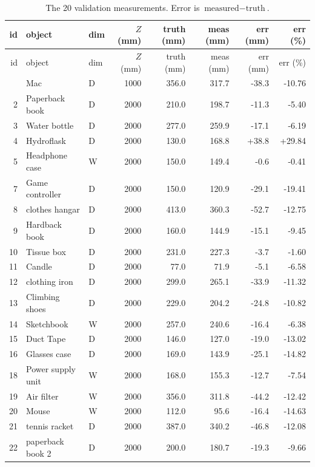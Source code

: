 \documentclass[11pt,a4paper]{article}
\begin{document}
\begin{longtable}{rllrrrrr}
\caption{The 20 validation measurements. Error is
$\text{measured} - \text{truth}$.}
\label{tab:meas} \\
\toprule
id & object & dim & $Z$ (mm) & truth (mm) & meas (mm) & err (mm) & err (\%) \\
\midrule
\endfirsthead
\toprule
id & object & dim & $Z$ (mm) & truth (mm) & meas (mm) & err (mm) & err (\%) \\
\midrule
\endhead
\bottomrule
\endfoot
1 & Mac & D & 1000 & 356.0 & 317.7 & -38.3 & -10.76 \\
2 & Paperback book & D & 2000 & 210.0 & 198.7 & -11.3 & -5.40 \\
3 & Water bottle & D & 2000 & 277.0 & 259.9 & -17.1 & -6.19 \\
4 & Hydroflask & D & 2000 & 130.0 & 168.8 & +38.8 & +29.84 \\
5 & Headphone case & W & 2000 & 150.0 & 149.4 & -0.6 & -0.41 \\
7 & Game controller & D & 2000 & 150.0 & 120.9 & -29.1 & -19.41 \\
8 & clothes hangar & D & 2000 & 413.0 & 360.3 & -52.7 & -12.75 \\
9 & Hardback book & D & 2000 & 160.0 & 144.9 & -15.1 & -9.45 \\
10 & Tissue box & D & 2000 & 231.0 & 227.3 & -3.7 & -1.60 \\
11 & Candle & D & 2000 & 77.0 & 71.9 & -5.1 & -6.58 \\
12 & clothing iron & D & 2000 & 299.0 & 265.1 & -33.9 & -11.32 \\
13 & Climbing shoes & D & 2000 & 229.0 & 204.2 & -24.8 & -10.82 \\
14 & Sketchbook & W & 2000 & 257.0 & 240.6 & -16.4 & -6.38 \\
15 & Duct Tape & D & 2000 & 146.0 & 127.0 & -19.0 & -13.02 \\
16 & Glasses case & D & 2000 & 169.0 & 143.9 & -25.1 & -14.82 \\
18 & Power supply unit & W & 2000 & 168.0 & 155.3 & -12.7 & -7.54 \\
19 & Air filter & W & 2000 & 356.0 & 311.8 & -44.2 & -12.42 \\
20 & Mouse & W & 2000 & 112.0 & 95.6 & -16.4 & -14.63 \\
21 & tennis racket & D & 2000 & 387.0 & 340.2 & -46.8 & -12.08 \\
22 & paperback book 2 & D & 2000 & 200.0 & 180.7 & -19.3 & -9.66 \\
\end{longtable}
\end{document}
